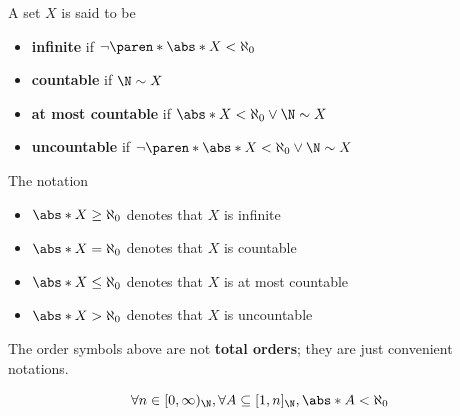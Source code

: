 \begin{definition} \label{an1:def:infinite-countable-uncountable-sets}
  A set $X$ is said to be
  \begin{itemize}
    \item \textbf{infinite} if $\neg\paren*{\abs*{X} < \aleph_{0}}$
    \item \textbf{countable} if $\N \sim X$
    \item \textbf{at most countable} if $\abs*{X} < \aleph_{0} \lor \N \sim X$
    \item \textbf{uncountable} if $\neg\paren*{\abs*{X} < \aleph_{0} \lor \N \sim X}$
  \end{itemize}
  The notation
  \begin{itemize}
    \item $\abs*{X} \geq \aleph_{0}$ denotes that $X$ is infinite
    \item $\abs*{X} = \aleph_{0}$ denotes that $X$ is countable
    \item $\abs*{X} \leq \aleph_{0}$ denotes that $X$ is at most countable
    \item $\abs*{X} > \aleph_{0}$ denotes that $X$ is uncountable
  \end{itemize}
  The order symbols above are not \textbf{total orders}; they are just convenient notations.
\end{definition}

\begin{lemma} \label{an1:lem:subset-of-Nn-is-finite}
  \[
    \forall n \in [0, \infty)_{\N}, \forall A \subseteq [1, n]_{\N}, \abs*{A} < \aleph_{0}
  \]
\end{lemma}

